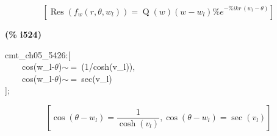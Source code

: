 \documentclass[fleqn]{article}
\begin{document}
\[\tag{\% o523} 
\left[ \operatorname{Res}\left( {f_w}\left( r\operatorname{,}\theta \operatorname{,}{w_l}\right) \right) =\operatorname{Q}(w) \left( w-{w_l}\right)  {{\% e}^{-\% i k r\, \left( {w_l}-\theta \right) }}\right] \mbox{}
\]


\noindent
\begin{minipage}[t]{4.000000em}\color{red}\bfseries
(\% i524)	
\end{minipage}
\begin{minipage}[t]{\textwidth}\color{blue}
cmt\_ch05\_5426:[\\
\ \ \ \ cos(w\_l-\ensuremath{\theta})\ensuremath{\sim\ }=\ (1/cosh(v\_l)),\\
\ \ \ \ cos(w\_l-\ensuremath{\theta})\ensuremath{\sim\ }=\ sec(v\_l)\\
];
\end{minipage}
\[\displaystyle \tag{\% o524} 
\left[ \cos{\left( \theta -{w_l}\right) }=\frac{1}{\cosh{\left( {v_l}\right) }}\operatorname{,}\cos{\left( \theta -{w_l}\right) }=\sec{\left( {v_l}\right) }\right] \mbox{}
\]
\end{document}
